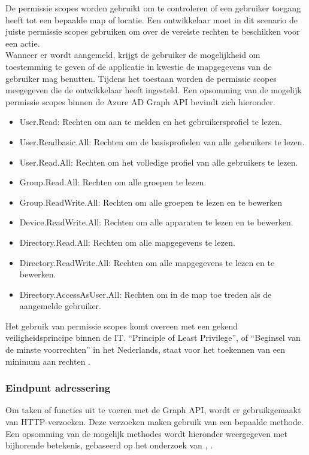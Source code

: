 De permissie scopes worden gebruikt om te controleren of een gebruiker toegang heeft tot een bepaalde map of locatie. Een ontwikkelaar moet in dit scenario de juiste permissie scopes gebruiken om over de vereiste rechten te beschikken voor een actie. \\

Wanneer er wordt aangemeld, krijgt de gebruiker de mogelijkheid om toestemming te geven of de applicatie in kwestie de mapgegevens van de gebruiker mag benutten. Tijdens het toestaan worden de permissie scopes meegegeven die de ontwikkelaar heeft ingesteld. Een opsomming van de mogelijk permissie scopes binnen de Azure \ac{AD} Graph \ac{API} bevindt zich hieronder. 

\begin{itemize}
    \item User.Read: Rechten om aan te melden en het gebruikersprofiel te lezen.
    \item User.Readbasic.All: Rechten om de basisprofielen van alle gebruikers te lezen.
    \item User.Read.All: Rechten om het volledige profiel van alle gebruikers te lezen.
    \item Group.Read.All: Rechten om alle groepen te lezen.
    \item Group.ReadWrite.All: Rechten om alle groepen te lezen en te bewerken
    \item Device.ReadWrite.All: Rechten om alle apparaten te lezen en te bewerken.
    \item Directory.Read.All: Rechten om alle mapgegevens te lezen.
    \item Directory.ReadWrite.All: Rechten om alle mapgegevens te lezen en te bewerken.
    \item Directory.AccessAsUser.All: Rechten om in de map toe treden als de aangemelde gebruiker.
\end{itemize}

Het gebruik van permissie scopes komt overeen met een gekend veiligheidsprincipe binnen de \ac{IT}. “Principle of Least Privilege”, of “Beginsel van de minste voorrechten” in het Nederlands, staat voor het toekennen van een minimum aan rechten \autocite{Saltzer1975}. 



\subsubsection{Eindpunt adressering}

Om taken of functies uit te voeren met de Graph \ac{API}, wordt er gebruikgemaakt van \ac{HTTP}-verzoeken. Deze verzoeken maken gebruik van een bepaalde methode. Een opsomming van de mogelijk methodes wordt hieronder weergegeven met bijhorende betekenis, gebaseerd op het onderzoek van \textcite{Fielding1999}, \textcite{Dusseault2010}.

